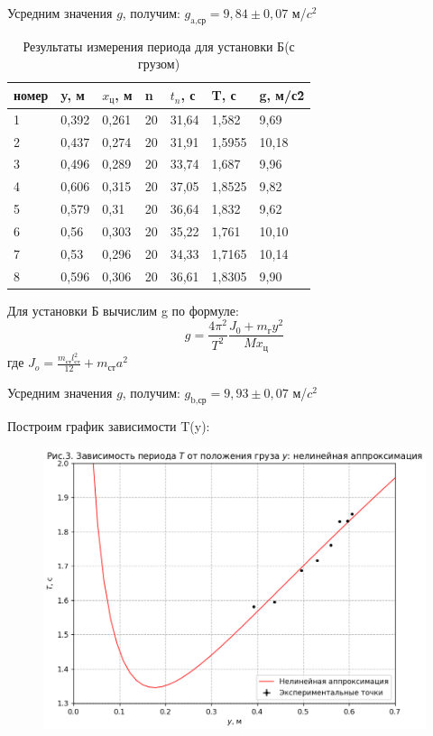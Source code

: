 \documentclass[a4paper,12pt]{article}
\begin{document}
Усредним значения $g$, получим: $g_{\mbox{a,ср}} = 9,84 \pm 0,07$ м/$c^2$


\begin{table}[H]
\centering
\caption{Результаты измерения периода для установки Б(с грузом)}
\begin{tabular}{|l|l|l|l|l|l|l|}
\hline
номер & y, м & $x_{\mbox{ц}}$, м & n & $t_n$, с & T, с & g, м/с\^2 \\ \hline
1 & 0,392 & 0,261 & 20 & 31,64 & 1,582 & 9,69\\ \hline
2 & 0,437 & 0,274 & 20 & 31,91 & 1,5955 & 10,18 \\ \hline
3 & 0,496 & 0,289 & 20 & 33,74 & 1,687 & 9,96 \\ \hline
4 & 0,606 & 0,315 & 20 & 37,05 & 1,8525 & 9,82 \\ \hline
5 & 0,579 & 0,31 & 20 & 36,64 & 1,832 & 9,62 \\ \hline
6 & 0,56 & 0,303 & 20 & 35,22 & 1,761 & 10,10 \\ \hline
7 & 0,53 & 0,296 & 20 & 34,33 & 1,7165 & 10,14 \\ \hline
8 & 0,596 & 0,306 & 20 & 36,61 & 1,8305 & 9,90 \\ \hline
\end{tabular}
\end{table}

Для установки Б вычислим g по формуле:
\begin{equation}
g = \frac{4\pi^{2}}{T^2} \frac{J_0 + m_{\mbox{г}}y^2}{Mx_{\mbox{ц}}}
\end{equation}
где $J_o = \frac{m_{\mbox{ст}}l_{\mbox{ст}}^2}{12} + m_{\mbox{ст}}a^2$

Усредним значения $g$, получим: $g_{\mbox{b,ср}} = 9,93\pm 0,07$ м/$c^2$

Построим график зависимости T(y):
\begin{figure}[H]
\begin{center}
\includegraphics[width=1\textwidth]{T(a)}
\end{center}
\end{figure}
\end{document}
